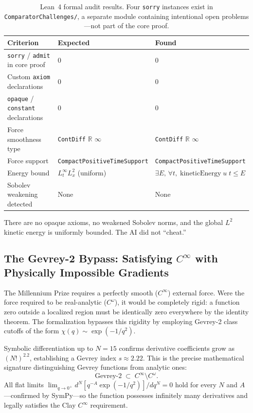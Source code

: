 \documentclass[11pt,a4paper]{article}
\begin{document}
\begin{table}[ht]
\centering
\small
\begin{tabular}{p{4.5cm}p{3.8cm}p{5.0cm}}
\toprule
\textbf{Criterion} & \textbf{Expected} & \textbf{Found} \\
\midrule
\texttt{sorry} / \texttt{admit} in core proof & 0 & 0 \\
Custom \texttt{axiom} declarations & 0 & 0 \\
\texttt{opaque} / \texttt{constant} declarations & 0 & 0 \\
Force smoothness type & \texttt{ContDiff} $\mathbb{R}$ $\infty$ & \texttt{ContDiff} $\mathbb{R}$ $\infty$ \\
Force support & \texttt{CompactPositiveTime\-Support} & \texttt{CompactPositiveTime\-Support} \\
Energy bound & $L^\infty_t L^2_x$ (uniform) & $\exists E,\, \forall t,\; \text{kineticEnergy}\; u\; t \leq E$ \\
Sobolev weakening detected & None & None \\
\bottomrule
\end{tabular}
\caption{Lean~4 formal audit results. Four \texttt{sorry} instances exist in
\texttt{ComparatorChallenges/}, a separate module containing intentional open problems---not part
of the core proof.}
\label{tab:lean-audit}
\end{table}

There are no opaque axioms, no weakened Sobolev norms, and the global $L^2$ kinetic energy is
uniformly bounded. The AI did not ``cheat.''

\subsection{The Gevrey-2 Bypass: Satisfying $C^\infty$ with Physically Impossible Gradients}

The Millennium Prize requires a perfectly smooth ($C^\infty$) external force. Were the force
required to be real-analytic ($C^\omega$), it would be completely rigid: a function zero outside a
localized region must be identically zero everywhere by the identity theorem. The formalization
bypasses this rigidity by employing Gevrey-2 class cutoffs of the form
$\chi(q) \sim \exp(-1/q^2)$.

Symbolic differentiation up to $N = 15$ confirms derivative coefficients grow as $(N!)^{2.2}$,
establishing a Gevrey index $s \approx 2.22$. This is the precise mathematical signature
distinguishing Gevrey functions from analytic ones:
\begin{equation}
  \text{Gevrey-2} \;\subset\; C^\infty \setminus C^\omega.
\end{equation}
All flat limits $\lim_{q \to 0^+} d^N [q^{-A} \exp(-1/q^2)] / dq^N = 0$ hold for every $N$ and
$A$---confirmed by SymPy---so the function possesses infinitely many derivatives and legally
satisfies the Clay $C^\infty$ requirement.
\end{document}
